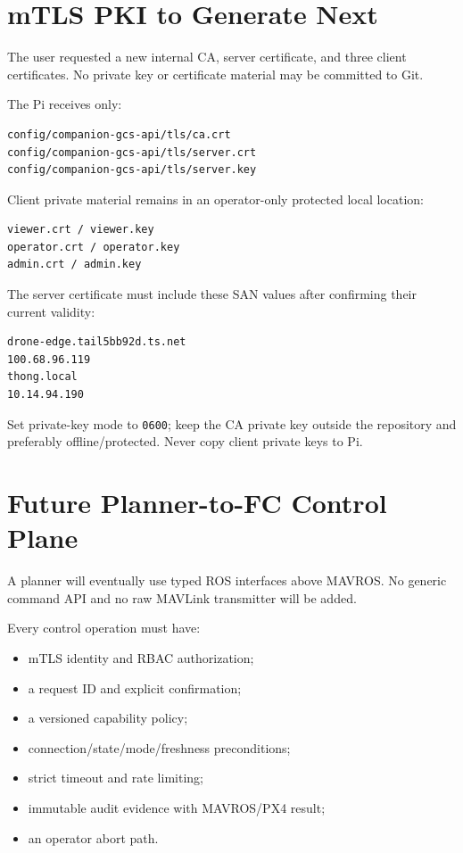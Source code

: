 \documentclass[11pt,a4paper]{article}
\newcommand{\pathtext}[1]{\texttt{#1}}
\begin{document}
\section{mTLS PKI to Generate Next}

The user requested a new internal CA, server certificate, and three client
certificates. No private key or certificate material may be committed to Git.

The Pi receives only:

\begin{lstlisting}
config/companion-gcs-api/tls/ca.crt
config/companion-gcs-api/tls/server.crt
config/companion-gcs-api/tls/server.key
\end{lstlisting}

Client private material remains in an operator-only protected local location:

\begin{lstlisting}
viewer.crt / viewer.key
operator.crt / operator.key
admin.crt / admin.key
\end{lstlisting}

The server certificate must include these SAN values after confirming their
current validity:

\begin{lstlisting}
drone-edge.tail5bb92d.ts.net
100.68.96.119
thong.local
10.14.94.190
\end{lstlisting}

Set private-key mode to \pathtext{0600}; keep the CA private key outside the
repository and preferably offline/protected. Never copy client private keys to Pi.

\section{Future Planner-to-FC Control Plane}

A planner will eventually use typed ROS interfaces above MAVROS. No generic
command API and no raw MAVLink transmitter will be added.

Every control operation must have:

\begin{itemize}
  \item mTLS identity and RBAC authorization;
  \item a request ID and explicit confirmation;
  \item a versioned capability policy;
  \item connection/state/mode/freshness preconditions;
  \item strict timeout and rate limiting;
  \item immutable audit evidence with MAVROS/PX4 result;
  \item an operator abort path.
\end{itemize}
\end{document}
